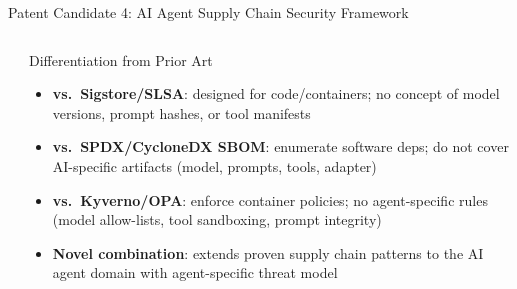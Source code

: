 \begin{frame}{\fontsize{9}{11}\selectfont Patent Candidate 4: AI Agent Supply Chain Security Framework}
\begin{columns}[T]
\begin{center}
    \end{center}

    \begin{exampleblock}{\fontsize{5.5}{6.5}\selectfont Differentiation from Prior Art}
      \fontsize{5.5}{6.5}\selectfont
      \begin{itemize}
        \setlength{\itemsep}{0pt}
        \item \textbf{vs.\ Sigstore/SLSA}: designed for code/containers; no
              concept of model versions, prompt hashes, or tool manifests
        \item \textbf{vs.\ SPDX/CycloneDX SBOM}: enumerate software deps; do
              not cover AI-specific artifacts (model, prompts, tools, adapter)
        \item \textbf{vs.\ Kyverno/OPA}: enforce container policies; no
              agent-specific rules (model allow-lists, tool sandboxing, prompt
              integrity)
        \item \textbf{Novel combination}: extends proven supply chain patterns
              to the AI agent domain with agent-specific threat model
      \end{itemize}
    \end{exampleblock}
  \end{columns}
\end{frame}


